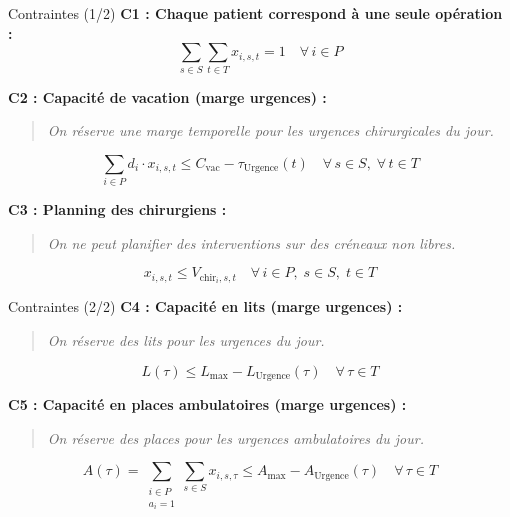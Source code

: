 \documentclass[aspectratio=169,11pt]{beamer}
\begin{document}
\begin{frame}{Contraintes (1/2)}
  \small
  \textbf{C1 : Chaque patient correspond à une seule opération :}
  $$\sum_{s \in S} \sum_{t \in T} x_{i,s,t} = 1 \quad \forall\, i \in P$$

  \vspace{0.3em}
  \textbf{C2 : Capacité de vacation (marge urgences) :}
  \begin{quote}
    \small\textit{On réserve une marge temporelle pour les urgences chirurgicales du jour.}
  \end{quote}
  $$\sum_{i \in P} d_i \cdot x_{i,s,t} \leq C_{\text{vac}} - \tau_{\text{Urgence}}(t) \quad \forall\, s \in S,\; \forall\, t \in T$$

  \vspace{0.3em}
  \textbf{C3 : Planning des chirurgiens :}
  \begin{quote}
    \small\textit{On ne peut planifier des interventions sur des créneaux non libres.}
  \end{quote}
  $$x_{i,s,t} \leq V_{\text{chir}_i, s, t} \quad \forall\, i \in P,\; s \in S,\; t \in T$$
\end{frame}

\begin{frame}{Contraintes (2/2)}
  \small
  \textbf{C4 : Capacité en lits (marge urgences) :}
  \begin{quote}
    \small\textit{On réserve des lits pour les urgences du jour.}
  \end{quote}
  $$L(\tau) \leq L_{\max} - L_{\text{Urgence}}(\tau) \quad \forall\, \tau \in T$$

  \vspace{0.8em}
  \textbf{C5 : Capacité en places ambulatoires (marge urgences) :}
  \begin{quote}
    \small\textit{On réserve des places pour les urgences ambulatoires du jour.}
  \end{quote}
  $$A(\tau) = \!\!\!\sum_{\substack{i \in P \\ a_i = 1}} \sum_{s \in S} x_{i,s,\tau} \leq A_{\max} - A_{\text{Urgence}}(\tau) \quad \forall\, \tau \in T$$
\end{frame}
\end{document}
